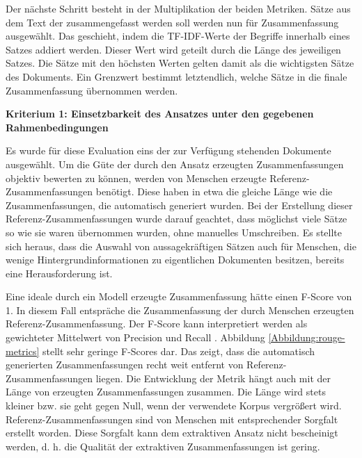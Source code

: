 Der nächste Schritt besteht in der Multiplikation der beiden Metriken. Sätze aus dem Text der zusammengefasst werden soll werden nun für Zusammenfassung ausgewählt. Das geschieht, indem die TF-IDF-Werte der Begriffe innerhalb eines Satzes addiert werden. Dieser Wert wird geteilt durch die Länge des jeweiligen Satzes. Die Sätze mit den höchsten Werten gelten damit als die wichtigsten Sätze des Dokuments. Ein Grenzwert bestimmt letztendlich, welche Sätze in die finale Zusammenfassung übernommen werden.

{\bf Kriterium 1: Einsetzbarkeit des Ansatzes unter den gegebenen Rahmenbedingungen}

Es wurde für diese Evaluation eins der zur Verfügung stehenden Dokumente ausgewählt.
Um die Güte der durch den Ansatz erzeugten Zusammenfassungen objektiv bewerten zu können, werden von Menschen erzeugte Referenz-Zusammenfassungen benötigt. Diese haben in etwa die gleiche Länge wie die Zusammenfassungen, die automatisch generiert wurden. Bei der Erstellung dieser Referenz-Zusammenfassungen wurde darauf geachtet, dass möglichst viele Sätze so wie sie waren übernommen wurden, ohne manuelles Umschreiben. Es stellte sich heraus, dass die Auswahl von aussagekräftigen Sätzen auch für Menschen, die wenige Hintergrundinformationen zu eigentlichen Dokumenten besitzen, bereits eine Herausforderung ist.
 
Eine ideale durch ein Modell erzeugte Zusammenfassung hätte einen F-Score von 1. In diesem Fall entspräche die Zusammenfassung der durch Menschen erzeugten Referenz-Zusammenfassung. Der F-Score kann interpretiert werden als gewichteter Mittelwert von Precision und Recall \cite{scikit2}. Abbildung \ref{Abbildung:rouge-metrics} stellt sehr geringe F-Scores dar. Das zeigt, dass die automatisch generierten Zusammenfassungen recht weit entfernt von Referenz-Zusammenfassungen liegen. Die Entwicklung der Metrik hängt auch mit der Länge von erzeugten Zusammenfassungen zusammen. Die Länge wird stets kleiner bzw. sie geht gegen Null, wenn der verwendete Korpus vergrößert wird.
Referenz-Zusammenfassungen sind von Menschen mit entsprechender Sorgfalt erstellt worden. Diese Sorgfalt kann dem extraktiven Ansatz nicht bescheinigt werden, d. h. die Qualität der extraktiven Zusammenfassungen ist gering.

